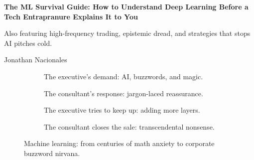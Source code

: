 
\begin{titlepage}
  \centering

  {\LARGE\bfseries The ML Survival Guide: How to Understand Deep Learning Before a Tech Entrapranure Explains It to You \par}
  \vspace{1em}
  {\large Also featuring high-frequency trading, epistemic dread, and strategies that stops AI pitches cold. \par}
  {\small Jonathan Nacionales \par}
  

  \vfill

\begin{figure}[H]
    \centering

    \begin{subfigure}[t]{0.45\textwidth}
    \centering
    \caption*{The executive’s demand: AI, buzzwords, and magic.}
    \end{subfigure}
    \hfill
    \begin{subfigure}[t]{0.45\textwidth}
    \centering
    \caption*{The consultant’s response: jargon-laced reassurance.}
    \end{subfigure}

    \vspace{1em}

    \begin{subfigure}[t]{0.45\textwidth}
    \centering
    \caption*{The executive tries to keep up: adding more layers.}
    \end{subfigure}
    \hfill
    \begin{subfigure}[t]{0.45\textwidth}
    \centering
    \caption*{The consultant closes the sale: transcendental nonsense.}
    \end{subfigure}

    \caption*{Machine learning: from centuries of math anxiety to corporate buzzword nirvana.}
\end{figure}

\end{titlepage}